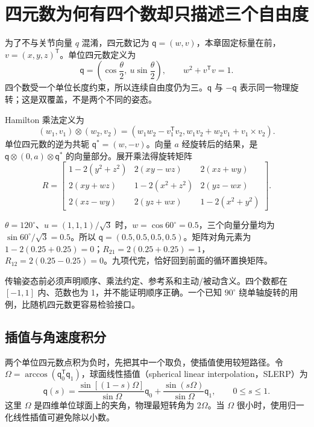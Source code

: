 \section{四元数为何有四个数却只描述三个自由度}
为了不与关节向量 $q$ 混淆，四元数记为 $\mathsf q=(w,v)$，本章固定标量在前，$v=(x,y,z)^\mathsf T$。单位四元数定义为
\begin{equation}
 \mathsf q=\left(\cos\frac\theta2,\ u\sin\frac\theta2\right),
 \qquad w^2+v^\mathsf Tv=1.
\end{equation}
四个数受一个单位长度约束，所以连续自由度仍为三。$\mathsf q$ 与 $-\mathsf q$ 表示同一物理旋转；这是双覆盖，不是两个不同的姿态。

Hamilton 乘法定义为
\begin{equation}
 (w_1,v_1)\otimes(w_2,v_2)
 =(w_1w_2-v_1^\mathsf Tv_2,
 w_1v_2+w_2v_1+v_1\times v_2).
\end{equation}
单位四元数的逆为共轭 $\mathsf q^*=(w,-v)$。向量 $a$ 经旋转后的结果，是 $\mathsf q\otimes(0,a)\otimes\mathsf q^*$ 的向量部分。展开乘法得旋转矩阵
\begin{equation}
 R=\begin{bmatrix}
 1-2(y^2+z^2)&2(xy-wz)&2(xz+wy)\\
 2(xy+wz)&1-2(x^2+z^2)&2(yz-wx)\\
 2(xz-wy)&2(yz+wx)&1-2(x^2+y^2)
 \end{bmatrix}.
\end{equation}
\begin{examplebox}[算例 用四元数重算上一节的旋转]
$\theta=120^\circ$、$u=(1,1,1)/\sqrt3$ 时，$w=\cos60^\circ=0.5$，三个向量分量均为 $\sin60^\circ/\sqrt3=0.5$。所以 $\mathsf q=(0.5,0.5,0.5,0.5)$。矩阵对角元素为 $1-2(0.25+0.25)=0$；$R_{21}=2(0.25+0.25)=1$，$R_{12}=2(0.25-0.25)=0$。九项代完，恰好回到前面的循环置换矩阵。
\end{examplebox}

传输姿态前必须声明顺序、乘法约定、参考系和主动/被动含义。四个数都在 $[-1,1]$ 内、范数也为 1，并不能证明顺序正确。一个已知 $90^\circ$ 绕单轴旋转的用例，比随机四元数更容易检验接口。

\subsection{插值与角速度积分}
两个单位四元数点积为负时，先把其中一个取负，使插值使用较短路径。令 $\Omega=\arccos(\mathsf q_0^\mathsf T\mathsf q_1)$，球面线性插值（spherical linear interpolation，SLERP）为
\begin{equation}
 \mathsf q(s)=\frac{\sin[(1-s)\Omega]}{\sin\Omega}\mathsf q_0
 +\frac{\sin(s\Omega)}{\sin\Omega}\mathsf q_1,
 \qquad 0\le s\le1.
\end{equation}
这里 $\Omega$ 是四维单位球面上的夹角，物理最短转角为 $2\Omega$。当 $\Omega$ 很小时，使用归一化线性插值可避免除以小数。

